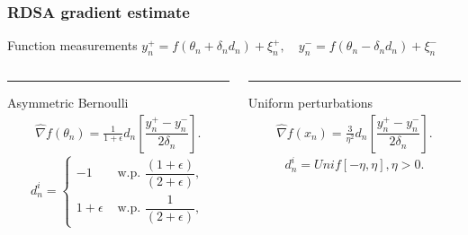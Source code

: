 \begin{frame}
\begin{small}
\frametitle{\centering  RDSA gradient estimate}

\begin{block}{Function measurements}
$y_{n}^+ = f(\theta_n+\delta_n d_n) + \xi_{n}^+,\quad y_{n}^- = f(\theta_n-\delta_n d_n) + \xi_{n}^-$
\end{block}
\begin{block}{}
\begin{columns}[T]
\begin{column}{.48\textwidth}
\color{red}\rule{\linewidth}{4pt}
Asymmetric Bernoulli
\begin{align}
\label{eq:grad-unif}
\widehat\nabla f(\theta_n) = \frac{1}{1+\epsilon} d_n \left[ \dfrac{y_n^+ - y_n^-}{2\delta_n}\right].
\end{align}
\begin{equation}
\label{eq:det-proj}
 d_n^i =
  \begin{cases}
   -1 &  \text{ w.p. } \dfrac{(1+\epsilon)}{(2+\epsilon)}, \\
   1+\epsilon &  \text{ w.p. } \dfrac{1}{(2+\epsilon)},
  \end{cases}
\end{equation}
\end{column}
\begin{column}{.48\textwidth}
\color{blue}\rule{\linewidth}{4pt}
Uniform perturbations
\begin{align}
\label{eq:grad-unif}
\widehat\nabla f(x_n) = \frac3{\eta^2} d_n \left[ \dfrac{y_n^+ - y_n^-}{2\delta_n}\right].
\end{align}
\begin{equation}
\label{eq:det-proj-unif}
 d_n^i = Unif[-\eta,\eta], \eta>0.
 \end{equation}
\end{column}
\end{columns}
\end{block}
\end{small}
\end{frame}


